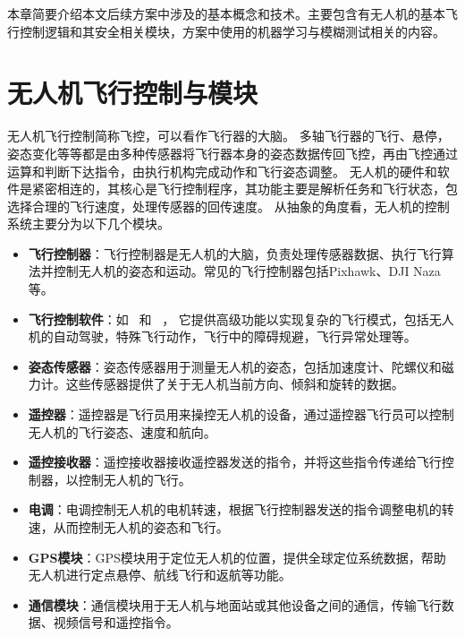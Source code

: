 本章简要介绍本文后续方案中涉及的基本概念和技术。主要包含有无人机的基本飞行控制逻辑和其安全相关模块，方案中使用的机器学习与模糊测试相关的内容。

\section{无人机飞行控制与模块}
无人机飞行控制简称飞控，可以看作飞行器的大脑。
多轴飞行器的飞行、悬停，姿态变化等等都是由多种传感器将飞行器本身的姿态数据传回飞控，再由飞控通过运算和判断下达指令，由执行机构完成动作和飞行姿态调整。
无人机的硬件和软件是紧密相连的，其核心是飞行控制程序，其功能主要是解析任务和飞行状态，包选择合理的飞行速度，处理传感器的回传速度。
从抽象的角度看，无人机的控制系统主要分为以下几个模块。

\begin{itemize}
\item \textbf{飞行控制器}：飞行控制器是无人机的大脑，负责处理传感器数据、执行飞行算法并控制无人机的姿态和运动。常见的飞行控制器包括Pixhawk、DJI Naza等。

\item \textbf{飞行控制软件}：如~\cite{ardupilot} 和 ~\cite{px4}，
  它提供高级功能以实现复杂的飞行模式，包括无人机的自动驾驶，特殊飞行动作，飞行中的障碍规避，飞行异常处理等。

\item \textbf{姿态传感器}：姿态传感器用于测量无人机的姿态，包括加速度计、陀螺仪和磁力计。这些传感器提供了关于无人机当前方向、倾斜和旋转的数据。

\item \textbf{遥控器}：遥控器是飞行员用来操控无人机的设备，通过遥控器飞行员可以控制无人机的飞行姿态、速度和航向。

\item \textbf{遥控接收器}：遥控接收器接收遥控器发送的指令，并将这些指令传递给飞行控制器，以控制无人机的飞行。

\item \textbf{电调}：电调控制无人机的电机转速，根据飞行控制器发送的指令调整电机的转速，从而控制无人机的姿态和飞行。

\item \textbf{GPS模块}：GPS模块用于定位无人机的位置，提供全球定位系统数据，帮助无人机进行定点悬停、航线飞行和返航等功能。

\item \textbf{通信模块}：通信模块用于无人机与地面站或其他设备之间的通信，传输飞行数据、视频信号和遥控指令。

\end{itemize}



